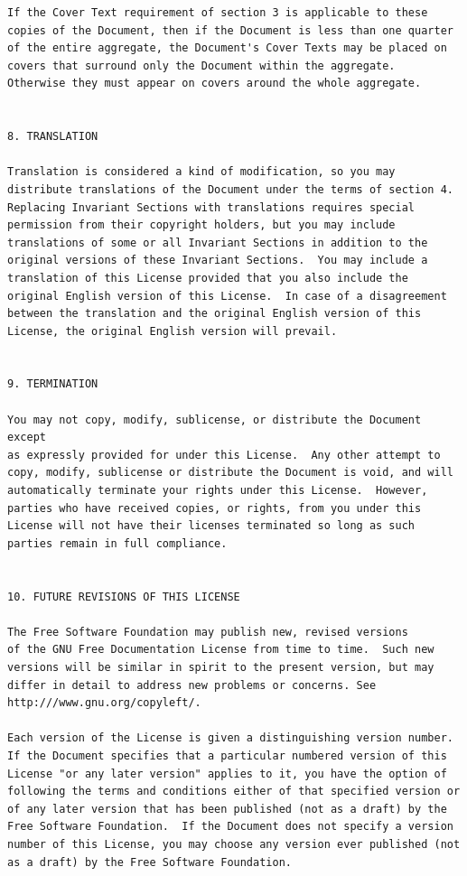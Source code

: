 \documentclass[12pt]{report}
\begin{document}
\begin{verbatim}
If the Cover Text requirement of section 3 is applicable to these
copies of the Document, then if the Document is less than one quarter
of the entire aggregate, the Document's Cover Texts may be placed on
covers that surround only the Document within the aggregate.
Otherwise they must appear on covers around the whole aggregate.


8. TRANSLATION

Translation is considered a kind of modification, so you may
distribute translations of the Document under the terms of section 4.
Replacing Invariant Sections with translations requires special
permission from their copyright holders, but you may include
translations of some or all Invariant Sections in addition to the
original versions of these Invariant Sections.  You may include a
translation of this License provided that you also include the
original English version of this License.  In case of a disagreement
between the translation and the original English version of this
License, the original English version will prevail.


9. TERMINATION

You may not copy, modify, sublicense, or distribute the Document except
as expressly provided for under this License.  Any other attempt to
copy, modify, sublicense or distribute the Document is void, and will
automatically terminate your rights under this License.  However,
parties who have received copies, or rights, from you under this
License will not have their licenses terminated so long as such
parties remain in full compliance.


10. FUTURE REVISIONS OF THIS LICENSE

The Free Software Foundation may publish new, revised versions
of the GNU Free Documentation License from time to time.  Such new
versions will be similar in spirit to the present version, but may
differ in detail to address new problems or concerns. See
http:///www.gnu.org/copyleft/.

Each version of the License is given a distinguishing version number.
If the Document specifies that a particular numbered version of this
License "or any later version" applies to it, you have the option of
following the terms and conditions either of that specified version or
of any later version that has been published (not as a draft) by the
Free Software Foundation.  If the Document does not specify a version
number of this License, you may choose any version ever published (not
as a draft) by the Free Software Foundation.


\end{verbatim}
\end{document}
